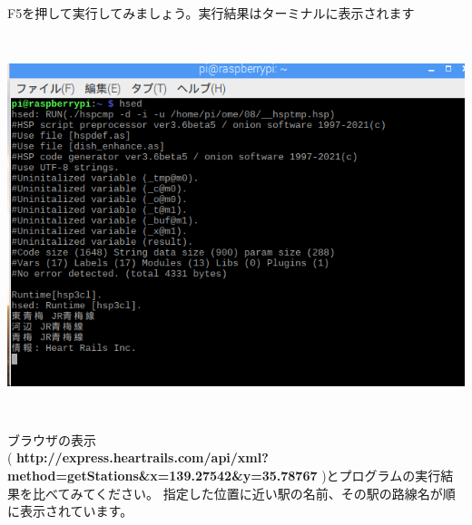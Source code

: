 \documentclass[a4paper,12pt,dvipdfmx]{jarticle}
\begin{document}
\bigskip

\clearpage
F5を押して実行してみましょう。実行結果はターミナルに表示されます



\begin{center}
\includegraphics[width=17.006cm,height=11.077cm]{textbook-img051.png}

\end{center}
ブラウザの表示\\(
\textbf{http://express.heartrails.com/api/xml?method=getStations\&x=139.27542\&y=35.78767}
)とプログラムの実行結果を比べてみてください。
指定した位置に近い駅の名前、その駅の路線名が順に表示されています。
\end{document}
